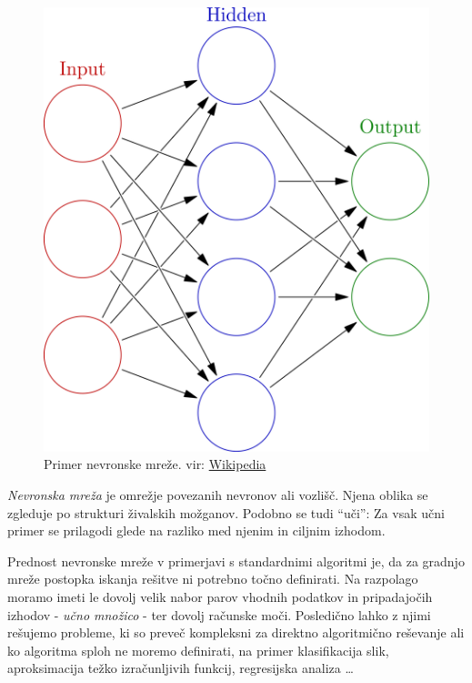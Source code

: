 \documentclass[a4paper,11pt]{article}
\begin{document}
\begin{figure}[htbp]
\begin{center}
\includegraphics[scale=0.25]{neural_network.png}
\caption{Primer nevronske mreže. vir:
	\href{https://en.wikipedia.org/wiki/Artificial\_neural\_network\#/media/File:Colored\_neural\_network.svg}{Wikipedia}}
\label{slika1}
\end{center}
\end{figure}
\emph{Nevronska mreža} je omrežje povezanih nevronov ali vozlišč.\cite{ann_def_1}
Njena oblika se zgleduje po strukturi živalskih možganov.\cite{ann_def_2}
Podobno se tudi ``uči'': Za vsak učni primer se prilagodi glede na razliko med njenim in ciljnim izhodom.

Prednost nevronske mreže v primerjavi s standardnimi algoritmi je, da za gradnjo mreže postopka iskanja rešitve ni potrebno točno definirati.
Na razpolago moramo imeti le dovolj velik nabor parov vhodnih podatkov in pripadajočih izhodov - \emph{učno množico} - ter dovolj računske moči.
Posledično lahko z njimi rešujemo probleme, ki so preveč kompleksni za direktno algoritmično reševanje ali ko algoritma sploh ne moremo definirati,
	na primer klasifikacija slik, aproksimacija težko izračunljivih funkcij, regresijska analiza \ldots
\end{document}
